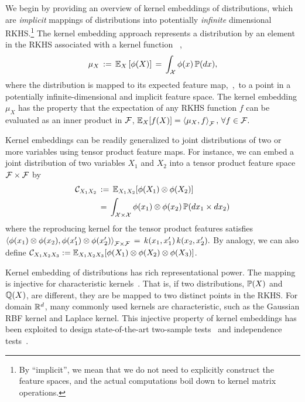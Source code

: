 \documentclass{article}
\begin{document}
We begin by providing an overview of kernel embeddings of distributions, which are \emph{implicit} mappings of distributions into potentially \emph{infinite} dimensional RKHS.\footnote{By ``implicit'', we mean that we do not need to explicitly construct the feature spaces, and the actual computations boil down to kernel matrix operations.} The kernel embedding approach represents a distribution by an element in the RKHS associated with a kernel function \, \cite{SmoGreSonSch07,SriGreFukLanetal08},
\begin{align}
  \mu_{X} \, := \, \mathbb{E}_{X} \left[\phi(X)\right] \, = \, \int_{\mathcal{X}} \phi(x) \, \mathbb{P}(dx),  \label{eq:embedding}
\end{align}
where the distribution is mapped to its expected feature map,~\ie,~to a point in a potentially infinite-dimensional and implicit feature space.
 The kernel embedding $\mu_{X}$ has the property that the expectation of any RKHS function $f$ can be evaluated as an inner product in $\mathcal{F}$,
$
  \mathbb{E}_{X} [f(X)] = \left\langle \mu_{X},f \right\rangle_{\mathcal{F}}, \, \forall f\in\mathcal{F}.
$

Kernel embeddings can be readily generalized to joint distributions of two or more variables using tensor product feature maps. For instance, we can embed a joint distribution of two variables $X_1$ and $X_2$ into a tensor product feature space $\mathcal{F}\times \mathcal{F}$ by
\begin{align}
    \mathcal{C}_{X_1X_2} \, &:= \, \mathbb{E}_{X_1X_2}[\phi(X_1)\otimes \phi(X_2)] \\
    \, &= \, \int_{\mathcal{X} \times \mathcal{X}} \phi(x_1) \otimes \phi(x_2) \, \mathbb{P}(dx_1 \times dx_2)
\end{align}
where the reproducing kernel for the tensor product features satisfies
$
	\left\langle \phi(x_1)\otimes \phi(x_2) ,\phi(x_1')\otimes \phi(x_2')  \right\rangle_{\mathcal{F}\times \mathcal{F}} \, = \,  k(x_1,x_1')\,k(x_2,x_2').
$
By analogy, we can also define $\mathcal{C}_{X_1X_2X_3} := \mathbb{E}_{X_1X_2X_3}[\phi(X_1)\otimes\phi(X_2)\otimes \phi(X_3)]$.

Kernel embedding of distributions has rich representational power. The mapping is injective for characteristic kernels~\cite{SriGreFukLanetal08}. That is, if two distributions, $\mathbb{P}(X)$ and $\mathbb{Q}(X)$, are different, they are be mapped to two distinct points in the RKHS. For domain $\mathbb{R}^d$, many commonly used kernels are characteristic, such as the Gaussian RBF kernel and Laplace kernel.
This injective property of kernel embeddings has been exploited to design  state-of-the-art two-sample tests~\cite{GreBorRasSchetal12} and  independence tests~\cite{GreFukTeoSonetal08}.
\end{document}
